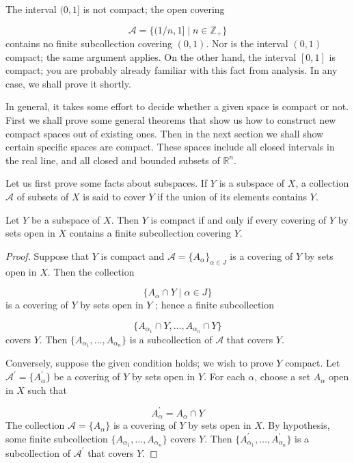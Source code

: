 \begin{centeredblock}
\begin{example}
\label{ex:\thesection.\theexample}
 The interval \((0,1\rbrack\) is not compact; the open covering

\[
\mathcal{A} = \{ {(1/n,1\rbrack \mid n \in {\mathbb{Z}}_{ + }}\}
\]
contains no finite subcollection covering \((0,1)\). Nor is the interval \((0,1)\) compact; the same argument applies. On the other hand, the interval \([ {0,1}]\) is compact; you are probably already familiar with this fact from analysis. In any case, we shall prove it shortly.
\end{example}
\end{centeredblock}

In general, it takes some effort to decide whether a given space is compact or not. First we shall prove some general theorems that show us how to construct new compact spaces out of existing ones. Then in the next section we shall show certain specific spaces are compact. These spaces include all closed intervals in the real line, and all closed and bounded subsets of \(\mathbb{R}^{n}\).

Let us first prove some facts about subspaces. If \(Y\) is a subspace of \(X\), a collection \(\mathcal{A}\) of subsets of \(X\) is said to cover \(Y\) if the union of its elements contains \(Y\).

\begin{lemma}
\label{lem:\thetheorem}
 Let \(Y\) be a subspace of \(X\). Then \(Y\) is compact if and only if every covering of \(Y\) by sets open in \(X\) contains a finite subcollection covering \(Y\).
\end{lemma}

\begin{proof}
Suppose that \(Y\) is compact and \(\mathcal{A} = {\{ A_{\alpha }\} }_{\alpha \in J}\) is a covering of \(Y\) by sets open in \(X\). Then the collection

\[
\{ {A_{\alpha } \cap Y \mid \alpha \in J}\}
\]
is a covering of \(Y\) by sets open in \(Y\) ; hence a finite subcollection

\[
\{ {A_{{\alpha }_{1}} \cap Y,\ldots ,A_{{\alpha }_{n}} \cap Y}\}
\]
covers \(Y\). Then \(\{ {A_{{\alpha }_{1}},\ldots ,A_{{\alpha }_{n}}}\}\) is a subcollection of \(\mathcal{A}\) that covers \(Y\).

Conversely, suppose the given condition holds; we wish to prove \(Y\) compact. Let \(\mathcal{A}^{\prime } = \{ A_{\alpha }^{\prime }\}\) be a covering of \(Y\) by sets open in \(Y\). For each \(\alpha\), choose a set \(A_{\alpha }\) open in \(X\) such that

\[
A_{\alpha }^{\prime } = A_{\alpha } \cap Y
\]
The collection \(\mathcal{A} = \{ A_{\alpha }\}\) is a covering of \(Y\) by sets open in \(X\). By hypothesis, some finite subcollection \(\{ {A_{{\alpha }_{1}},\ldots ,A_{{\alpha }_{n}}}\}\) covers \(Y\). Then \(\{ {A_{{\alpha }_{1}}^{\prime },\ldots ,A_{{\alpha }_{n}}^{\prime }}\}\) is a subcollection of \(\mathcal{A}^{\prime }\) that covers \(Y\).
\end{proof}

